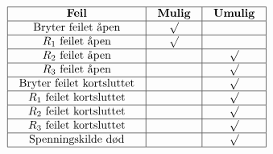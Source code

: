 $$\vbox{\offinterlineskip
\halign{\strut
\vrule \quad\hfil # \ \hfil & 
\vrule \quad\hfil # \ \hfil & 
\vrule \quad\hfil # \ \hfil \vrule \cr
\noalign{\hrule}
%
{\bf Feil} & {\bf Mulig} & {\bf Umulig} \cr
%
\noalign{\hrule}
%
Bryter feilet åpen & $\surd$ &  \cr
%
\noalign{\hrule}
%
$R_1$ feilet åpen & $\surd$ &  \cr
%
\noalign{\hrule}
%
$R_2$ feilet åpen &  & $\surd$ \cr
%
\noalign{\hrule}
%
$R_3$ feilet åpen &  & $\surd$ \cr
%
\noalign{\hrule}
%
Bryter feilet kortsluttet &  & $\surd$ \cr
%
\noalign{\hrule}
%
$R_1$ feilet kortsluttet &  & $\surd$ \cr
%
\noalign{\hrule}
%
$R_2$ feilet kortsluttet &  & $\surd$ \cr
%
\noalign{\hrule}
%
$R_3$ feilet kortsluttet &  & $\surd$ \cr
%
\noalign{\hrule}
%
Spenningskilde død &  & $\surd$ \cr
%
\noalign{\hrule}
} %
}$$ %









